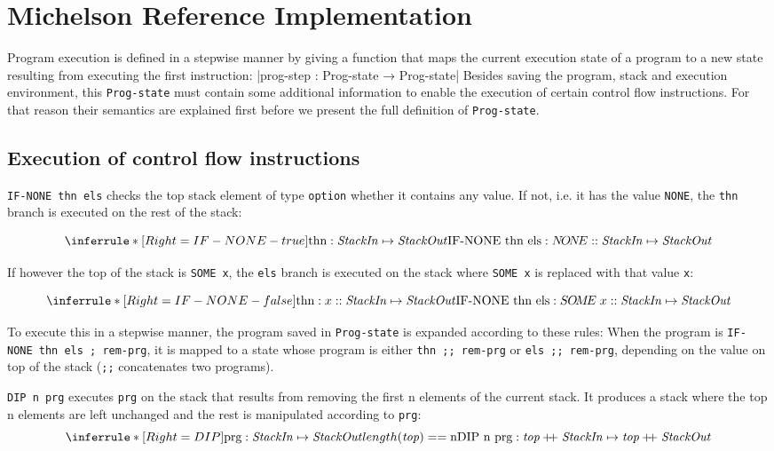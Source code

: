\section{Michelson Reference Implementation}
\label{sec:refImpl}

Program execution is defined in a stepwise manner by giving a function that maps
the current execution state of a program to a new state resulting from executing
the first instruction:
|prog-step : Prog-state → Prog-state|
Besides saving the program, stack and execution environment, this \verb/Prog-state/ must contain
some additional information to enable the execution of certain control flow instructions.
For that reason their semantics are explained first
before we present the full definition of \verb/Prog-state/.

\subsection{Execution of control flow instructions}\label{sec:control-flow}

\verb/IF-NONE thn els/ checks the top stack element of type \verb/option/
whether it contains any value.
If not, i.e. it has the value \verb/NONE/, the \verb/thn/ branch is executed on the
rest of the stack:

\[	\inferrule*	[Right=IF-NONE-true]
 	{\text{thn} : \text{\emph{StackIn}} \mapsto \text{\emph{StackOut}}}
 	{\text{IF-NONE thn els} : N\!O\!N\!E :: \text{\emph{StackIn}} 
		\mapsto \text{\emph{StackOut}}}
\]

If however the top of the stack is \verb/SOME x/,
the \verb/els/ branch is executed on the stack where \verb/SOME x/
is replaced with that value \verb/x/:

\[	\inferrule*	[Right=IF-NONE-false]
	{\text{thn} : x :: \text{\emph{StackIn}} \mapsto \text{\emph{StackOut}}}
	{\text{IF-NONE thn els} : S\!\!\;O\!M\!E\; x :: \text{\emph{StackIn}} 
		\mapsto \text{\emph{StackOut}}}
\]

To execute this in a stepwise manner, the program saved in \verb/Prog-state/ is
expanded according to these rules:
When the program is \verb/IF-NONE thn els ; rem-prg/, it is mapped to a state
whose program is either \verb/thn ;; rem-prg/ or \verb/els ;; rem-prg/,
depending on the value on top of the stack (\verb/;;/ concatenates two programs).

\verb/DIP n prg/ executes \verb/prg/ on the stack that results from removing the first n elements
of the current stack.
It produces a stack where the top n elements are left unchanged
and the rest is manipulated according to \verb/prg/:
\[	\inferrule*	[Right=DIP]
	{\text{prg} : \text{\emph{StackIn}} \mapsto \text{\emph{StackOut}}
	\\\\	length(\text{\emph{top}}) == \text{n}}
	{\text{DIP n prg} :	\text{\emph{top}} +\!\!\!+\; \text{\emph{StackIn}}
		\mapsto		\text{\emph{top}} +\!\!\!+\; \text{\emph{StackOut}} }
\]

